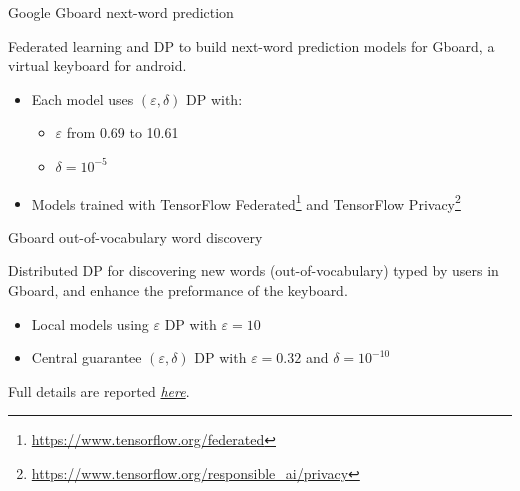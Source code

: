 \documentclass[12pt,aspectratio=169,handout]{beamer}
\begin{document}

\begin{frame}{Google Gboard next-word prediction}

Federated learning and DP to build next-word prediction models for Gboard, a virtual keyboard for android. 

\begin{itemize} \setlength\itemsep{2mm}
%
\item Each model uses $(\varepsilon, \delta)$ DP with:
%
\begin{itemize} \setlength\itemsep{1mm}
%
\item $\varepsilon$ from 0.69 to 10.61
%
\item $\delta = 10^{-5}$
%
\end{itemize}
%
\item Models trained with TensorFlow Federated\footnote{\url{https://www.tensorflow.org/federated}} and TensorFlow Privacy\footnote{\url{https://www.tensorflow.org/responsible_ai/privacy}}
%
\end{itemize}


\end{frame}


\begin{frame}{Gboard out-of-vocabulary word discovery}

Distributed DP for discovering new words (out-of-vocabulary) typed by users in Gboard, and enhance the preformance of the keyboard. \vskip2mm 

\begin{itemize} \setlength\itemsep{3mm}
%
\item Local models using $\varepsilon$ DP with $\varepsilon = 10$  
%
\item Central guarantee $(\varepsilon, \delta)$ DP with $\varepsilon = 0.32$ and $\delta = 10^{-10}$ 
%
\end{itemize}

Full details are reported {\it \href{https://research.google/blog/improving-gboard-language-models-via-private-federated-analytics/}{here}}.


\end{frame}
\end{document}
